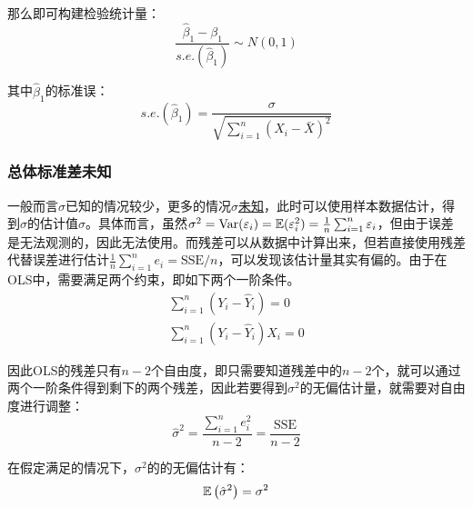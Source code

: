 \documentclass[11pt]{article}
\begin{document}
那么即可构建检验统计量：
\begin{equation*}
    \frac{\hat{\beta}_1 - \beta_1}{s.e.(\hat{\beta}_1)} \sim N(0,1)
\end{equation*}

其中$\hat{\beta}_1$的标准误：
\begin{equation*}
    s.e.(\hat{\beta}_1) = \frac{\sigma}{\sqrt{\sum_{i=1}^{n} \left(X_i - \bar{X}\right)^2}}
\end{equation*}

\subsubsection*{总体标准差未知}

一般而言$\sigma$已知的情况较少，更多的情况$\sigma$\uline{未知}，此时可以使用样本数据估计，得到$\sigma$的估计值$\hat{\sigma}$。具体而言，虽然$\sigma^2 = \operatorname{Var}(\varepsilon_i) = \mathbb{E}(\varepsilon_i^2) = \frac{1}{n} \sum_{i=1}^{n} \varepsilon_i$，但由于误差是无法观测的，因此无法使用。而残差可以从数据中计算出来，但若直接使用残差代替误差进行估计$\frac{1}{n} \sum_{i=1}^{n} e_i = \text{SSE}/n$，可以发现该估计量其实有偏的。由于在OLS中，需要满足两个约束，即如下两个一阶条件。
\begin{gather*}
    \sum_{i=1}^{n} \left( Y_i - \hat{Y}_i \right) = 0 \\
    \sum_{i=1}^{n} \left( Y_i - \hat{Y}_i \right) X_i = 0
\end{gather*}

因此OLS的残差只有$n-2$个自由度，即只需要知道残差中的$n-2$个，就可以通过两个一阶条件得到剩下的两个残差，因此若要得到$\sigma^2$的无偏估计量，就需要对自由度进行调整：
\begin{equation*}
    \hat{\sigma}^2 = \frac{\sum_{i=1}^{n} e_i^2}{n-2} = \frac{\text{SSE}}{n-2}
\end{equation*}

在假定满足的情况下，$\sigma^2$的的无偏估计有：
\begin{equation*}
    \mathbb{E}\left( \hat{\sigma}^2 \right) = \sigma^2
\end{equation*}
\end{document}
